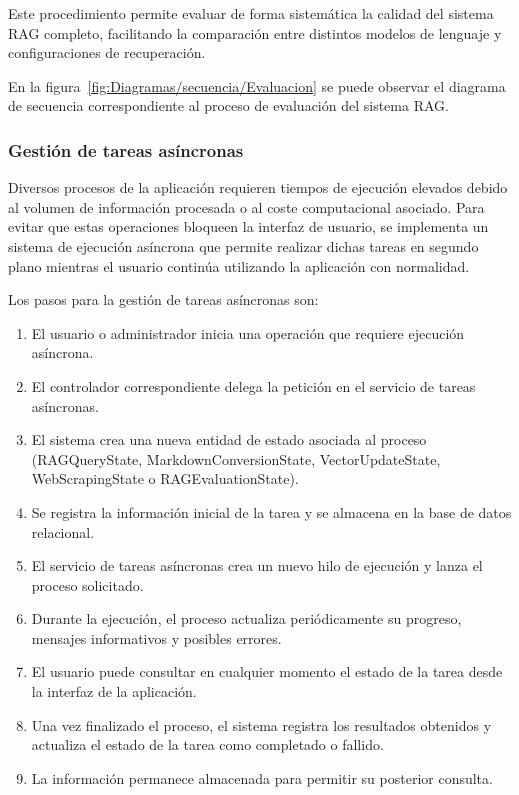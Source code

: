 Este procedimiento permite evaluar de forma sistemática la calidad del sistema RAG completo, facilitando la comparación entre distintos modelos de lenguaje y configuraciones de recuperación.

En la figura~\ref{fig:Diagramas/secuencia/Evaluacion} se puede observar el diagrama de secuencia correspondiente al proceso de evaluación del sistema RAG.


\subsubsection{Gestión de tareas asíncronas}

Diversos procesos de la aplicación requieren tiempos de ejecución elevados debido al volumen de información procesada o al coste computacional asociado. Para evitar que estas operaciones bloqueen la interfaz de usuario, se implementa un sistema de ejecución asíncrona que permite realizar dichas tareas en segundo plano mientras el usuario continúa utilizando la aplicación con normalidad.

Los pasos para la gestión de tareas asíncronas son:
\begin{enumerate}
	\item El usuario o administrador inicia una operación que requiere ejecución asíncrona.
	\item El controlador correspondiente delega la petición en el servicio de tareas asíncronas.
	\item El sistema crea una nueva entidad de estado asociada al proceso (RAGQueryState, MarkdownConversionState, VectorUpdateState, WebScrapingState o RAGEvaluationState).
	\item Se registra la información inicial de la tarea y se almacena en la base de datos relacional.
	\item El servicio de tareas asíncronas crea un nuevo hilo de ejecución y lanza el proceso solicitado.
	\item Durante la ejecución, el proceso actualiza periódicamente su progreso, mensajes informativos y posibles errores.
	\item El usuario puede consultar en cualquier momento el estado de la tarea desde la interfaz de la aplicación.
	\item Una vez finalizado el proceso, el sistema registra los resultados obtenidos y actualiza el estado de la tarea como completado o fallido.
	\item La información permanece almacenada para permitir su posterior consulta.
\end{enumerate}

